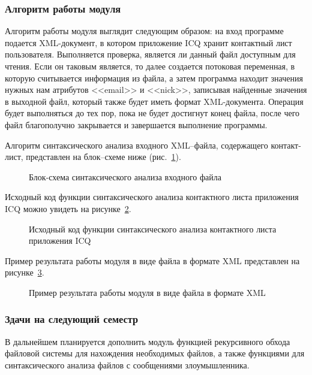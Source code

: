 \subsubsection{Алгоритм работы модуля}
Алгоритм работы модуля выглядит следующим образом: на вход программе подается XML-документ, в котором приложение ICQ хранит контактный лист пользователя. Выполняется проверка, является ли данный файл доступным для чтения. Если он таковым является, то далее создается потоковая переменная, в которую считывается информация из файла, а затем программа находит значения нужных нам атрибутов <<email>> и <<nick>>, записывая найденные значения в выходной файл, который также будет иметь формат XML-документа. Операция будет выполняться до тех пор, пока не будет достигнут конец файла, после чего файл благополучно закрывается и завершается выполнение программы.


Алгоритм синтаксического анализа входного XML--файла, содержащего контакт-лист, представлен на блок--схеме ниже (рис.~\ref{block_diagram:block_diagram}).

\begin{figure}[h!]
\caption{Блок-схема синтаксического анализа входного файла}
\label{block_diagram:block_diagram}
\end{figure}

Исходный код функции синтаксического анализа контактного листа приложения ICQ можно увидеть на рисунке~\ref{my_code:my_code}.

\begin{figure}[h!]
\caption{Исходный код функции синтаксического анализа контактного листа приложения ICQ}
\label{my_code:my_code}
\end{figure}

Пример результата работы модуля в виде файла в формате XML представлен на рисунке~\ref{output_xml:output_xml}.

\begin{figure}[ht]
\caption{Пример результата работы модуля в виде файла в формате XML}
\label{output_xml:output_xml}
\end{figure}

\subsubsection{Здачи на следующий семестр}

В дальнейшем планируется дополнить модуль функцией рекурсивного обхода файловой системы для нахождения необходимых файлов, а также функциями для синтаксического анализа файлов с сообщениями злоумышленника.

\clearpage
